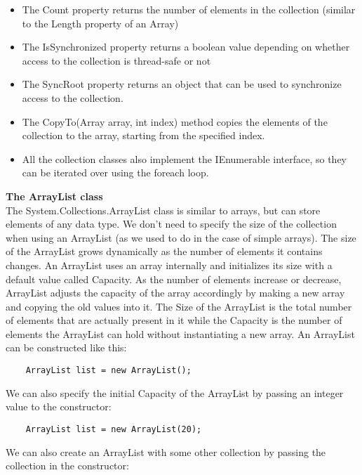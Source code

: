 \begin{itemize}
    \item The Count property returns the number of elements in the collection (similar to the Length property of an
    Array)
    \item The IsSynchronized property returns a boolean value depending on whether access to the collection is
    thread-safe or not
    \item The SyncRoot property returns an object that can be used to synchronize access to the collection.
    \item The CopyTo(Array array, int index) method copies the elements of the collection to the array, starting
    from the specified index.
    \item All the collection classes also implement the IEnumerable interface, so they can be iterated over using the foreach
    loop.     
\end{itemize}


\textbf{The ArrayList class}\\

The System.Collections.ArrayList class is similar to arrays, but can store elements of any data type. We don’t need
to specify the size of the collection when using an ArrayList (as we used to do in the case of simple arrays). The
size of the ArrayList grows dynamically as the number of elements it contains changes. An ArrayList uses an array
internally and initializes its size with a default value called Capacity. As the number of elements increase or
decrease, ArrayList adjusts the capacity of the array accordingly by making a new array and copying the old values
into it. The Size of the ArrayList is the total number of elements that are actually present in it while the Capacity is
the number of elements the ArrayList can hold without instantiating a new array. An ArrayList can be constructed
like this:

\begin{lstlisting}
    ArrayList list = new ArrayList();    
\end{lstlisting}

We can also specify the initial Capacity of the ArrayList by passing an integer value to the constructor:

\begin{lstlisting}
    ArrayList list = new ArrayList(20);    
\end{lstlisting}

We can also create an ArrayList with some other collection by passing the collection in the constructor:

